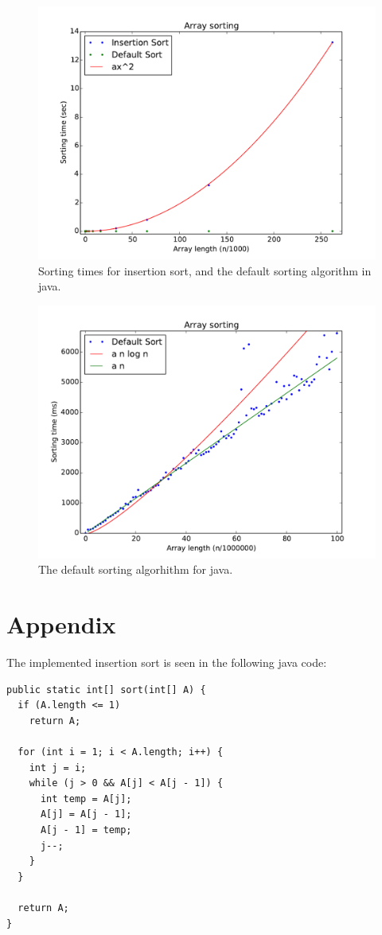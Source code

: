 \documentclass[11pt]{article}
\begin{document}
\begin{figure}
    \centering
    \includegraphics[width = 12cm]{SortingTime.pdf}
    \caption{Sorting times for insertion sort, and the default sorting algorithm in java.}
    \label{fig:comparison}
\end{figure}


\begin{figure}
    \centering
    \includegraphics[width = 12cm]{Default}
    \caption{The default sorting algorhithm for java.}
    \label{fig:default}
\end{figure}


 \newpage
 
 \section*{Appendix}
 
 The implemented insertion sort is seen in the following java code:
 
 \begin{lstlisting}
public static int[] sort(int[] A) {
  if (A.length <= 1)
    return A;

  for (int i = 1; i < A.length; i++) {
    int j = i;
    while (j > 0 && A[j] < A[j - 1]) {
      int temp = A[j];
      A[j] = A[j - 1];
      A[j - 1] = temp;
      j--;
    }
  }

  return A;
}
\end{lstlisting}
 
\end{document}
